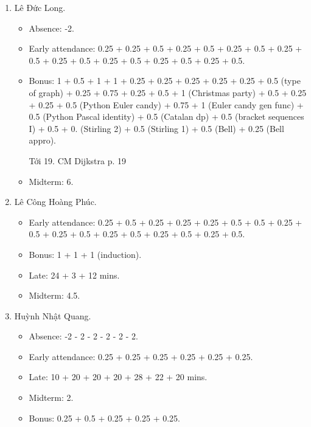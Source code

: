 \documentclass{article}
\begin{document}
\begin{enumerate}
\begin{itemize}
		\item Early attendance: 0.25 + 0.25 + 0.25 + 0.25 + 0.5 + 0.25 + 0.25.
		\item Bonus:
		\item Late: 23 + 60 + 15 mins.
        \item Midterm: 0.
	\end{itemize}
	\item {\sc Lê Đức Long.}
	\begin{itemize}
		\item Absence: -2.
		\item Early attendance: 0.25 + 0.25 + 0.5 + 0.25 + 0.5 + 0.25 + 0.5 + 0.25 + 0.5 + 0.25 + 0.5 + 0.25 + 0.5 + 0.25 + 0.5 + 0.25 + 0.5.
		\item Bonus: 1 + 0.5 + 1 + 1 + 0.25 + 0.25 + 0.25 + 0.25 + 0.25 + 0.5 (type of graph) + 0.25 + 0.75 + 0.25 + 0.5 + 1 (Christmas party) + 0.5 + 0.25 + 0.25 + 0.5 (Python Euler candy) + 0.75 + 1 (Euler candy gen func) + 0.5 (Python Pascal identity) + 0.5 (Catalan dp) + 0.5 (bracket sequences I) + 0.5 + 0. (Stirling 2) + 0.5 (Stirling 1) + 0.5 (Bell) + 0.25 (Bell appro).

        Tới 19. CM Dijkstra p. 19
        \item Midterm: 6.
	\end{itemize}
	\item {\sc Lê Công Hoàng Phúc.}
	\begin{itemize}
		\item Early attendance: 0.25 + 0.5 + 0.25 + 0.25 + 0.25 + 0.5 + 0.5 + 0.25 + 0.5 + 0.25 + 0.5 + 0.25 + 0.5 + 0.25 + 0.5 + 0.25 + 0.5.
		\item Bonus: 1 + 1 + 1 (induction).
		\item Late: 24 + 3 + 12 mins.
        \item Midterm: 4.5.
	\end{itemize}
	\item {\sc Huỳnh Nhật Quang.}
	\begin{itemize}
		\item Absence: -2 - 2 - 2 - 2 - 2 - 2.
		\item Early attendance: 0.25 + 0.25 + 0.25 + 0.25 + 0.25 + 0.25.
		\item Late: 10 + 20 + 20 + 20 + 28 + 22 + 20 mins.
        \item Midterm: 2.
		\item Bonus: 0.25 + 0.5 + 0.25 + 0.25 + 0.25.


\end{itemize}
\end{enumerate}
\end{document}
